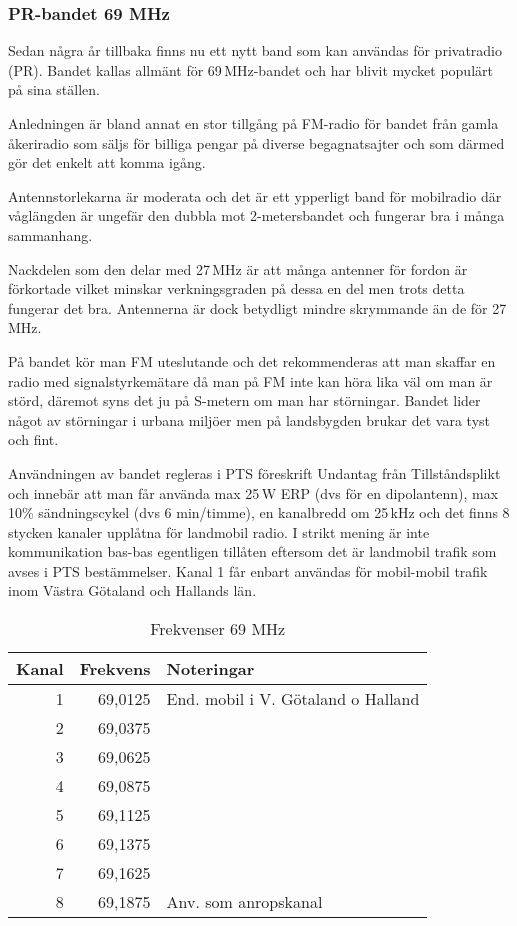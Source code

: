 \subsubsection{PR-bandet 69 MHz}

Sedan några år tillbaka finns nu ett nytt band som kan användas för
privatradio (PR). Bandet kallas allmänt för 69\,MHz-bandet och har
blivit mycket populärt på sina ställen.

Anledningen är bland annat en stor tillgång på FM-radio för bandet
från gamla åkeriradio som säljs för billiga pengar på diverse
begagnatsajter och som därmed gör det enkelt att komma igång.

Antennstorlekarna är moderata och det är ett ypperligt band för mobilradio där våglängden är ungefär den dubbla mot 2-metersbandet och fungerar bra i många sammanhang.

Nackdelen som den delar med 27\,MHz är att många antenner för fordon är förkortade vilket minskar verkningsgraden på dessa en del men trots detta fungerar det bra. Antennerna är dock betydligt mindre skrymmande än de för 27\,MHz.

På bandet kör man FM uteslutande och det rekommenderas att man skaffar en radio med signalstyrkemätare då man på FM inte kan höra lika väl om man är störd, däremot syns det ju på S-metern om man har störningar. Bandet lider något av störningar i urbana miljöer men på landsbygden brukar det vara tyst och fint.

Användningen av bandet regleras i PTS föreskrift Undantag från Tillståndsplikt och innebär att man får använda max 25\,W ERP (dvs för en dipolantenn), max 10\% sändningscykel (dvs 6 min/timme), en kanalbredd om 25\,kHz och det finns 8 stycken kanaler upplåtna för landmobil radio. I strikt mening är inte kommunikation bas-bas egentligen tillåten eftersom det är landmobil trafik som avses i PTS bestämmelser. Kanal 1 får enbart användas för mobil-mobil trafik inom Västra Götaland och Hallands län.

\begin{table}[h]
  \centering
\begin{tabular}{rrl}
  Kanal & Frekvens & Noteringar                         \\ \hline
  1     & 69,0125  & End. mobil i V. Götaland o Halland \\
  2     & 69,0375  &                                    \\
  3     & 69,0625  &                                    \\
  4     & 69,0875  &                                    \\
  5     & 69,1125  &                                    \\
  6     & 69,1375  &                                    \\
  7     & 69,1625  &                                    \\
  8     & 69,1875  & Anv. som anropskanal               \\
\end{tabular}
\caption{Frekvenser 69 MHz}
\end{table}

